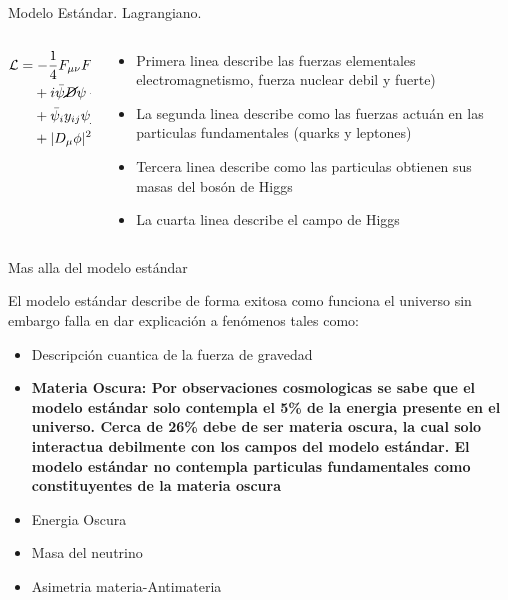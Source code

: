 \begin{frame}{Modelo Est\'andar. Lagrangiano.}

\begin{columns}
\begin{column}{0.35\textwidth}
\Large{
\begin{align*}
\mathcal{L} &= - \frac{1}{4} F_{\mu \nu} F^{\mu \nu} \\
    &\phantom{{}=}+ i \bar{\psi} \cancel{D} \psi + h.c. \\
    &\phantom{{}=}+ \bar{\psi}_i y_{ij} \psi_j \phi + h.c. \\
    &\phantom{{}=}+ |D_\mu \phi|^2 - V(\phi)
\end{align*}
}
\end{column}
\begin{column}{0.65\textwidth}  %
    \begin{itemize}
        \item Primera linea describe las fuerzas elementales electromagnetismo, fuerza nuclear debil y fuerte)
        \item La segunda linea describe como las fuerzas actu\'an en las particulas fundamentales (quarks y leptones)
        \item Tercera linea describe como las particulas obtienen sus masas del bos\'on de Higgs 
        \item La cuarta linea describe el campo de Higgs
    \end{itemize}
\end{column}
\end{columns}
\end{frame}


\begin{frame}{Mas alla del modelo est\'andar}

El modelo est\'andar describe de forma exitosa como funciona el universo sin embargo falla en dar explicaci\'on a fen\'omenos tales como:

\begin{itemize}
    \item Descripci\'on cuantica de la fuerza de gravedad
    \item \textbf{Materia Oscura: Por observaciones cosmologicas se sabe que el modelo est\'andar solo contempla el 5\% de la energia presente en el universo.  Cerca de 26\% debe de ser materia oscura, la cual solo interactua debilmente con los campos del modelo est\'andar. El modelo est\'andar no contempla particulas fundamentales como constituyentes de la materia oscura}
    \item Energia Oscura
    \item Masa del neutrino
    \item Asimetria materia-Antimateria
\end{itemize}
    
\end{frame}



